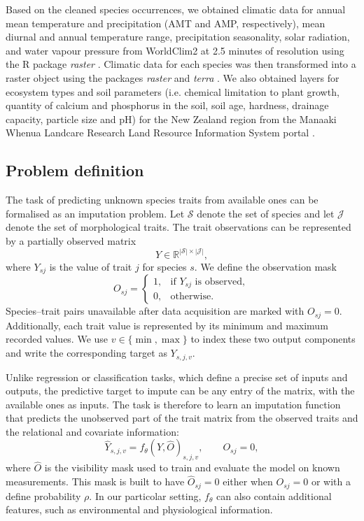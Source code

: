 \documentclass[preprint,12pt,authoryear]{elsarticle}
\begin{document}
Based on the cleaned species occurrences, we obtained climatic data for annual mean temperature and precipitation (AMT and AMP, respectively), mean diurnal and annual temperature range, precipitation seasonality, solar radiation, and water vapour pressure from WorldClim2 \citep{fick2017worldclim} at 2.5 minutes of resolution using the R package \textit{raster} \citep{hijmans2010raster}. Climatic data for each species was then transformed into a raster object using the packages \textit{raster} and \textit{terra} \citep{hijmans2022package}. We also obtained layers for ecosystem types and soil parameters (i.e. chemical limitation to plant growth, quantity of calcium and phosphorus in the soil, soil age, hardness, drainage capacity, particle size and pH) for the New Zealand region from the Manaaki Whenua Landcare Research Land Resource Information System portal \citep{LRIS}.

\subsection{Problem definition}

The task of predicting unknown species traits from available ones can be formalised as an imputation problem.
Let $\mathcal{S}$ denote the set of species and let $\mathcal{J}$ denote the set of morphological traits. The trait observations can be represented by a partially observed matrix
\begin{equation}
    Y \in \mathbb{R}^{|\mathcal{S}|\times|\mathcal{J}|},
\end{equation}
where $Y_{sj}$ is the value of trait $j$ for species $s$. We define the observation mask
\begin{equation}
    O_{sj}=\begin{cases}
        1, & \text{if }Y_{sj}\text{ is observed},\\
        0, & \text{otherwise}.
    \end{cases}
\end{equation}
Species--trait pairs unavailable after data acquisition are marked with $O_{sj}=0$. Additionally, each trait value is represented by its minimum and maximum recorded values. We use $v\in\{\min,\max\}$ to index these two output components and write the corresponding target as $Y_{s,j,v}$.

Unlike regression or classification tasks, which define a precise set of inputs and outputs, the predictive target to impute can be any entry of the matrix, with the available ones as inputs.
The task is therefore to learn an imputation function that predicts the unobserved part of the trait matrix from the observed traits and the relational and covariate information:
\begin{equation}
    \hat{Y}_{s,j,v}=f_{\theta}\left(Y,\hat O\right)_{s,j,v},
    \qquad O_{sj}=0,
\end{equation}
where $\hat O$ is the visibility mask used to train and evaluate the model on known measurements. This mask is built to have $\hat O_{sj}=0$ either when $O_{sj}=0$ or with a define probability $\rho$. In our particolar setting, $f_\theta$ can also contain additional features, such as environmental and physiological information.
\end{document}
